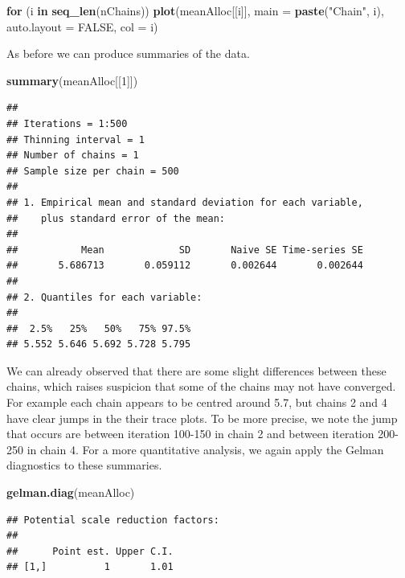 \documentclass[
]{article}
\newenvironment{Shaded}{\begin{snugshade}}{\end{snugshade}}
\newcommand{\ControlFlowTok}[1]{\textcolor[rgb]{0.13,0.29,0.53}{\textbf{#1}}}
\newcommand{\DataTypeTok}[1]{\textcolor[rgb]{0.13,0.29,0.53}{#1}}
\newcommand{\DecValTok}[1]{\textcolor[rgb]{0.00,0.00,0.81}{#1}}
\newcommand{\KeywordTok}[1]{\textcolor[rgb]{0.13,0.29,0.53}{\textbf{#1}}}
\newcommand{\NormalTok}[1]{#1}
\newcommand{\OtherTok}[1]{\textcolor[rgb]{0.56,0.35,0.01}{#1}}
\newcommand{\StringTok}[1]{\textcolor[rgb]{0.31,0.60,0.02}{#1}}
\begin{document}
\begin{Shaded}
\begin{Highlighting}[]
\ControlFlowTok{for}\NormalTok{ (i }\ControlFlowTok{in} \KeywordTok{seq_len}\NormalTok{(nChains))}
    \KeywordTok{plot}\NormalTok{(meanAlloc[[i]], }\DataTypeTok{main =} \KeywordTok{paste}\NormalTok{(}\StringTok{"Chain"}\NormalTok{, i), }\DataTypeTok{auto.layout =} \OtherTok{FALSE}\NormalTok{, }\DataTypeTok{col =}\NormalTok{ i)}
\end{Highlighting}
\end{Shaded}

As before we can produce summaries of the data.

\begin{Shaded}
\begin{Highlighting}[]
\KeywordTok{summary}\NormalTok{(meanAlloc[[}\DecValTok{1}\NormalTok{]])}
\end{Highlighting}
\end{Shaded}

\begin{verbatim}
## 
## Iterations = 1:500
## Thinning interval = 1 
## Number of chains = 1 
## Sample size per chain = 500 
## 
## 1. Empirical mean and standard deviation for each variable,
##    plus standard error of the mean:
## 
##           Mean             SD       Naive SE Time-series SE 
##       5.686713       0.059112       0.002644       0.002644 
## 
## 2. Quantiles for each variable:
## 
##  2.5%   25%   50%   75% 97.5% 
## 5.552 5.646 5.692 5.728 5.795
\end{verbatim}

We can already observed that there are some slight differences between
these chains, which raises suspicion that some of the chains may not
have converged. For example each chain appears to be centred around 5.7,
but chains 2 and 4 have clear jumps in the their trace plots. To be more
precise, we note the jump that occurs are between iteration 100-150 in
chain 2 and between iteration 200-250 in chain 4. For a more
quantitative analysis, we again apply the Gelman diagnostics to these
summaries.

\begin{Shaded}
\begin{Highlighting}[]
\KeywordTok{gelman.diag}\NormalTok{(meanAlloc)}
\end{Highlighting}
\end{Shaded}

\begin{verbatim}
## Potential scale reduction factors:
## 
##      Point est. Upper C.I.
## [1,]          1       1.01
\end{verbatim}
\end{document}
